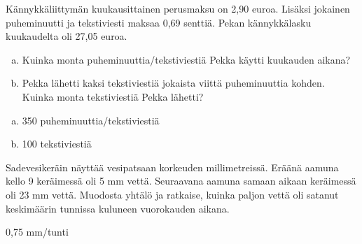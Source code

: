 \begin{tehtava}
Kännykkäliittymän kuukausittainen perusmaksu on 2,90 euroa. Lisäksi jokainen puheminuutti ja tekstiviesti maksaa 0,69 senttiä. Pekan kännykkälasku kuukaudelta oli 27,05 euroa.

\begin{enumerate}[a)]
	\item Kuinka monta puheminuuttia/tekstiviestiä Pekka käytti kuukauden aikana?
	\item Pekka lähetti kaksi tekstiviestiä jokaista viittä puheminuuttia kohden. Kuinka monta tekstiviestiä Pekka lähetti?
\end{enumerate}

	\begin{vastaus}
		\begin{enumerate}[a)]
			\item 350 puheminuuttia/tekstiviestiä
			\item 100 tekstiviestiä
		\end{enumerate}
	\end{vastaus}
\end{tehtava}

\begin{tehtava}
Sadevesikeräin näyttää vesipatsaan korkeuden millimetreissä. Eräänä aamuna kello 9 keräimessä oli 5 mm vettä. Seuraavana aamuna samaan aikaan keräimessä oli 23 mm vettä. Muodosta yhtälö ja ratkaise, kuinka paljon vettä oli satanut keskimäärin tunnissa kuluneen vuorokauden aikana.
	\begin{vastaus}
	0,75 mm/tunti
	\end{vastaus}
\end{tehtava}